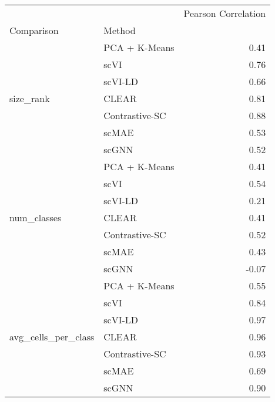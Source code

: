 \begin{tabular}{llr}
\toprule
 &  & Pearson Correlation \\
Comparison &  Method &  \\
\midrule
\multirow[t]{7}{*}{size\_rank} &\cellcolor{red!10} PCA + K-Means &\cellcolor{red!10} 0.41 \\
 &\cellcolor{red!10} scVI &\cellcolor{red!10} 0.76 \\
 &\cellcolor{red!10} scVI-LD &\cellcolor{red!10} 0.66 \\
 &\cellcolor{blue!10} CLEAR &\cellcolor{blue!10} 0.81 \\
 &\cellcolor{blue!10} Contrastive-SC &\cellcolor{blue!10} 0.88 \\
 &\cellcolor{blue!10} scMAE &\cellcolor{blue!10} 0.53 \\
 &\cellcolor{green!10} scGNN &\cellcolor{green!10} 0.52 \\
\cline{1-3}
\multirow[t]{7}{*}{num\_classes} &\cellcolor{red!10} PCA + K-Means &\cellcolor{red!10} 0.41 \\
 &\cellcolor{red!10} scVI &\cellcolor{red!10} 0.54 \\
 &\cellcolor{red!10} scVI-LD &\cellcolor{red!10} 0.21 \\
 &\cellcolor{blue!10} CLEAR &\cellcolor{blue!10} 0.41 \\
 &\cellcolor{blue!10} Contrastive-SC &\cellcolor{blue!10} 0.52 \\
 &\cellcolor{blue!10} scMAE &\cellcolor{blue!10} 0.43 \\
 &\cellcolor{green!10} scGNN &\cellcolor{green!10} -0.07 \\
\cline{1-3}
\multirow[t]{7}{*}{avg\_cells\_per\_class} &\cellcolor{red!10} PCA + K-Means &\cellcolor{red!10} 0.55 \\
 &\cellcolor{red!10} scVI &\cellcolor{red!10} 0.84 \\
 &\cellcolor{red!10} scVI-LD &\cellcolor{red!10} 0.97 \\
 &\cellcolor{blue!10} CLEAR &\cellcolor{blue!10} 0.96 \\
 &\cellcolor{blue!10} Contrastive-SC &\cellcolor{blue!10} 0.93 \\
 &\cellcolor{blue!10} scMAE &\cellcolor{blue!10} 0.69 \\
 &\cellcolor{green!10} scGNN &\cellcolor{green!10} 0.90 \\
\cline{1-3}
\bottomrule
\end{tabular}
